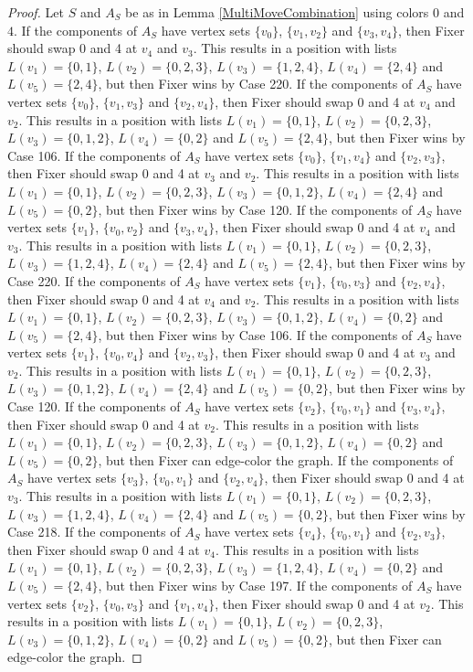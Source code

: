 \documentclass[12pt]{amsart}
\theoremstyle{plain}
\theoremstyle{definition}
\theoremstyle{remark}
\begin{document}
\begin{proof}
Let $S$ and $A_S$ be as in Lemma \ref{MultiMoveCombination} using colors $0$ and $4$. If the components of $A_S$ have vertex sets $\{v_0\}$, $\{v_1, v_2\}$ and $\{v_3, v_4\}$, then Fixer should swap 0 and 4 at $v_4$ and $v_3$. This results in a position with lists $L(v_1) = \{0, 1\}$, $L(v_2) = \{0, 2, 3\}$, $L(v_3) = \{1, 2, 4\}$, $L(v_4) = \{2, 4\}$ and $L(v_5) = \{2, 4\}$, but then Fixer wins by Case 220. If the components of $A_S$ have vertex sets $\{v_0\}$, $\{v_1, v_3\}$ and $\{v_2, v_4\}$, then Fixer should swap 0 and 4 at $v_4$ and $v_2$. This results in a position with lists $L(v_1) = \{0, 1\}$, $L(v_2) = \{0, 2, 3\}$, $L(v_3) = \{0, 1, 2\}$, $L(v_4) = \{0, 2\}$ and $L(v_5) = \{2, 4\}$, but then Fixer wins by Case 106. If the components of $A_S$ have vertex sets $\{v_0\}$, $\{v_1, v_4\}$ and $\{v_2, v_3\}$, then Fixer should swap 0 and 4 at $v_3$ and $v_2$. This results in a position with lists $L(v_1) = \{0, 1\}$, $L(v_2) = \{0, 2, 3\}$, $L(v_3) = \{0, 1, 2\}$, $L(v_4) = \{2, 4\}$ and $L(v_5) = \{0, 2\}$, but then Fixer wins by Case 120. If the components of $A_S$ have vertex sets $\{v_1\}$, $\{v_0, v_2\}$ and $\{v_3, v_4\}$, then Fixer should swap 0 and 4 at $v_4$ and $v_3$. This results in a position with lists $L(v_1) = \{0, 1\}$, $L(v_2) = \{0, 2, 3\}$, $L(v_3) = \{1, 2, 4\}$, $L(v_4) = \{2, 4\}$ and $L(v_5) = \{2, 4\}$, but then Fixer wins by Case 220. If the components of $A_S$ have vertex sets $\{v_1\}$, $\{v_0, v_3\}$ and $\{v_2, v_4\}$, then Fixer should swap 0 and 4 at $v_4$ and $v_2$. This results in a position with lists $L(v_1) = \{0, 1\}$, $L(v_2) = \{0, 2, 3\}$, $L(v_3) = \{0, 1, 2\}$, $L(v_4) = \{0, 2\}$ and $L(v_5) = \{2, 4\}$, but then Fixer wins by Case 106. If the components of $A_S$ have vertex sets $\{v_1\}$, $\{v_0, v_4\}$ and $\{v_2, v_3\}$, then Fixer should swap 0 and 4 at $v_3$ and $v_2$. This results in a position with lists $L(v_1) = \{0, 1\}$, $L(v_2) = \{0, 2, 3\}$, $L(v_3) = \{0, 1, 2\}$, $L(v_4) = \{2, 4\}$ and $L(v_5) = \{0, 2\}$, but then Fixer wins by Case 120. If the components of $A_S$ have vertex sets $\{v_2\}$, $\{v_0, v_1\}$ and $\{v_3, v_4\}$, then Fixer should swap 0 and 4 at $v_2$. This results in a position with lists $L(v_1) = \{0, 1\}$, $L(v_2) = \{0, 2, 3\}$, $L(v_3) = \{0, 1, 2\}$, $L(v_4) = \{0, 2\}$ and $L(v_5) = \{0, 2\}$, but then Fixer can edge-color the graph. If the components of $A_S$ have vertex sets $\{v_3\}$, $\{v_0, v_1\}$ and $\{v_2, v_4\}$, then Fixer should swap 0 and 4 at $v_3$. This results in a position with lists $L(v_1) = \{0, 1\}$, $L(v_2) = \{0, 2, 3\}$, $L(v_3) = \{1, 2, 4\}$, $L(v_4) = \{2, 4\}$ and $L(v_5) = \{0, 2\}$, but then Fixer wins by Case 218. If the components of $A_S$ have vertex sets $\{v_4\}$, $\{v_0, v_1\}$ and $\{v_2, v_3\}$, then Fixer should swap 0 and 4 at $v_4$. This results in a position with lists $L(v_1) = \{0, 1\}$, $L(v_2) = \{0, 2, 3\}$, $L(v_3) = \{1, 2, 4\}$, $L(v_4) = \{0, 2\}$ and $L(v_5) = \{2, 4\}$, but then Fixer wins by Case 197. If the components of $A_S$ have vertex sets $\{v_2\}$, $\{v_0, v_3\}$ and $\{v_1, v_4\}$, then Fixer should swap 0 and 4 at $v_2$. This results in a position with lists $L(v_1) = \{0, 1\}$, $L(v_2) = \{0, 2, 3\}$, $L(v_3) = \{0, 1, 2\}$, $L(v_4) = \{0, 2\}$ and $L(v_5) = \{0, 2\}$, but then Fixer can edge-color the graph. 
\end{proof}
\end{document}
